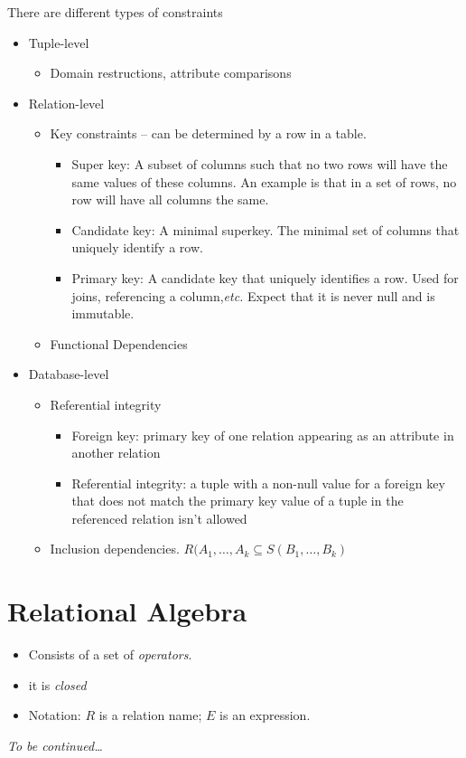 \documentclass[12pt]{article}
\begin{document}
There are different types of constraints
\begin{itemize}
    \item Tuple-level
        \begin{itemize}
            \item Domain restructions, attribute comparisons
        \end{itemize}
    \item Relation-level
        \begin{itemize}
            \item Key constraints -- can be determined by a row in a table.
                \begin{itemize}
                    \item Super key: A subset of columns such that no two rows
                        will have the same values of these columns. An example
                        is that in a set of rows, no row will have all columns
                        the same.
                    \item Candidate key: A minimal superkey. The minimal set of
                        columns that uniquely identify a row.
                    \item Primary key: A candidate key that uniquely identifies
                        a row. Used for joins, referencing a
                        column,\textit{etc.} Expect that it is never null and is
                        immutable.
                \end{itemize}
            \item Functional Dependencies
        \end{itemize}
    \item Database-level
        \begin{itemize}
            \item Referential integrity
                \begin{itemize}
                    \item Foreign key: primary key of one relation appearing as
                        an attribute in another relation
                    \item Referential integrity: a tuple with a non-null value
                        for a foreign key that does not match the primary key
                        value of a tuple in the referenced relation isn't
                        allowed
                \end{itemize}
            \item Inclusion dependencies.
                $R(A_1,\dots,A_k \subseteq S(B_1,\dots,B_k)$
        \end{itemize}
\end{itemize}

\section{Relational Algebra}

\begin{itemize}
    \item Consists of a set of \textit{operators}.
    \item it is \textit{closed}
    \item Notation: $R$ is a relation name; $E$ is an expression.
\end{itemize}

\textit{To be continued\dots}
\end{document}
